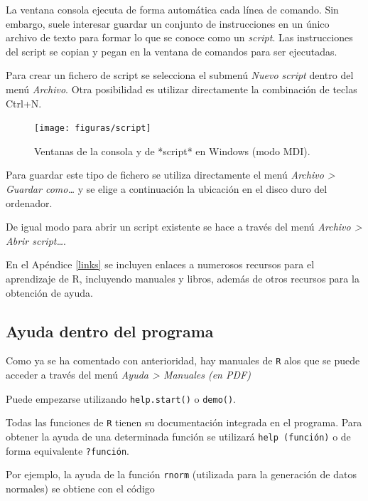 \documentclass[
]{book}
\theoremstyle{break}
\begin{document}
La ventana consola ejecuta de
forma automática cada línea de comando. Sin embargo, suele interesar
guardar un conjunto de instrucciones en un único archivo de texto para
formar lo que se conoce como un \emph{script}. Las instrucciones del script
se copian y pegan en la ventana de comandos para ser ejecutadas.

Para crear un fichero de script se selecciona el submenú \emph{Nuevo script}
dentro del menú \emph{Archivo}. Otra posibilidad es utilizar directamente la
combinación de teclas Ctrl+N.

\begin{figure}[!htb]

{\centering \texttt{[image: figuras/script]} 

}

\caption{Ventanas de la consola y de *script* en Windows (modo MDI).}\label{fig:script}
\end{figure}

Para guardar este tipo de fichero se utiliza directamente el menú \emph{Archivo \textgreater{} Guardar como\ldots{}}
y se elige a continuación la ubicación en el disco duro del ordenador.

De igual modo para abrir un script existente se hace a través del menú \emph{Archivo \textgreater{} Abrir script\ldots{}}.

En el Apéndice \ref{links} se incluyen enlaces a numerosos recursos para el aprendizaje de R,
incluyendo manuales y libros, además de otros recursos para la obtención de ayuda.

\hypertarget{ayuda-dentro-del-programa}{%
\subsection{Ayuda dentro del programa}\label{ayuda-dentro-del-programa}}

Como ya se ha comentado con anterioridad,
hay manuales de \texttt{R} alos que se puede acceder a través del menú
\emph{Ayuda \textgreater{} Manuales (en PDF)}

Puede empezarse utilizando \texttt{help.start()} o \texttt{demo()}.

Todas las funciones de \texttt{R} tienen su documentación integrada en
el programa. Para obtener la ayuda de una determinada función se
utilizará \texttt{help\ (función)} o de forma equivalente \texttt{?función}.

Por ejemplo, la ayuda de la función \texttt{rnorm} (utilizada para la
generación de datos normales) se obtiene con el código
\end{document}
